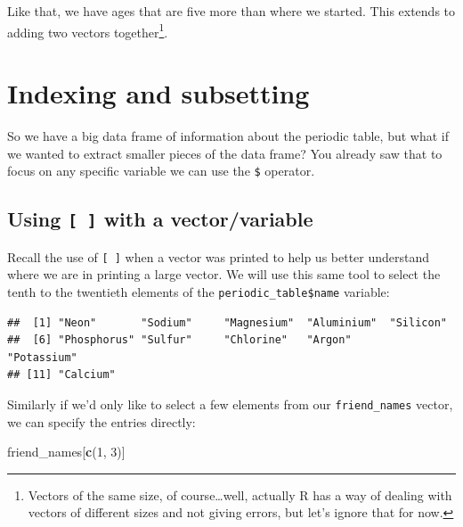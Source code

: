 \documentclass[]{tufte-book}
\newenvironment{Shaded}{\begin{snugshade}}{\end{snugshade}}
\newcommand{\KeywordTok}[1]{\textcolor[rgb]{0.13,0.29,0.53}{\textbf{{#1}}}}
\newcommand{\DecValTok}[1]{\textcolor[rgb]{0.00,0.00,0.81}{{#1}}}
\newcommand{\NormalTok}[1]{{#1}}
\begin{document}
Like that, we have ages that are five more than where we started. This
extends to adding two vectors together\footnote{Vectors of the same
  size, of course\ldots{}well, actually R has a way of dealing with
  vectors of different sizes and not giving errors, but let's ignore
  that for now.}.

\section{Indexing and subsetting}\label{index-sub}

So we have a big data frame of information about the periodic table, but
what if we wanted to extract smaller pieces of the data frame? You
already saw that to focus on any specific variable we can use the
\texttt{\$} operator.

\subsection{\texorpdfstring{Using \texttt{{[}\ {]}} with a
vector/variable}{Using {[} {]} with a vector/variable}}\label{using-with-a-vectorvariable}

Recall the use of \texttt{{[}\ {]}} when a vector was printed to help us
better understand where we are in printing a large vector. We will use
this same tool to select the tenth to the twentieth elements of the
\texttt{periodic\_table\$name} variable:

\begin{Shaded}
\end{Shaded}

\begin{verbatim}
##  [1] "Neon"       "Sodium"     "Magnesium"  "Aluminium"  "Silicon"   
##  [6] "Phosphorus" "Sulfur"     "Chlorine"   "Argon"      "Potassium" 
## [11] "Calcium"
\end{verbatim}

Similarly if we'd only like to select a few elements from our
\texttt{friend\_names} vector, we can specify the entries directly:

\begin{Shaded}
\begin{Highlighting}[]
\NormalTok{friend_names[}\KeywordTok{c}\NormalTok{(}\DecValTok{1}\NormalTok{, }\DecValTok{3}\NormalTok{)]}
\end{Highlighting}
\end{Shaded}
\end{document}
